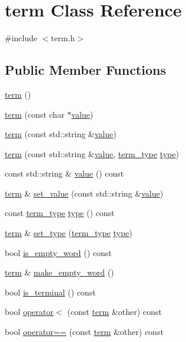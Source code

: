 \hypertarget{classterm}{}\section{term Class Reference}
\label{classterm}


{\ttfamily \#include $<$term.\+h$>$}

\subsection*{Public Member Functions}
\begin{DoxyCompactItemize}
\item 
\mbox{\hyperlink{classterm_ab3dfee59e9fa1b8fd77fcfd2e921c6bc}{term}} ()
\item 
\mbox{\hyperlink{classterm_ab2fd7e53046a9ceaf78f5e0245995103}{term}} (const char $\ast$\mbox{\hyperlink{classterm_a1c1e74f49a5ed295dba144950fe779f0}{value}})
\item 
\mbox{\hyperlink{classterm_afd455584c9f2c549142cadb7fec14ed6}{term}} (const std\+::string \&\mbox{\hyperlink{classterm_a1c1e74f49a5ed295dba144950fe779f0}{value}})
\item 
\mbox{\hyperlink{classterm_ad6dc20058aa4b1b5b9b9ce509de920c0}{term}} (const std\+::string \&\mbox{\hyperlink{classterm_a1c1e74f49a5ed295dba144950fe779f0}{value}}, \mbox{\hyperlink{term_8h_a01c5d13b4b82a95ffc3de77e52c7603b}{term\+\_\+type}} \mbox{\hyperlink{classterm_a572296f687be8c60d2c31e5c323abbb6}{type}})
\item 
const std\+::string \& \mbox{\hyperlink{classterm_a05d69d1ab04e91c8a6e4239e522a86d9}{value}} () const
\item 
\mbox{\hyperlink{classterm}{term}} \& \mbox{\hyperlink{classterm_acca1461208dd0dbb4a99f863e00fbcf0}{set\+\_\+value}} (const std\+::string \&\mbox{\hyperlink{classterm_a1c1e74f49a5ed295dba144950fe779f0}{value}})
\item 
const \mbox{\hyperlink{term_8h_a01c5d13b4b82a95ffc3de77e52c7603b}{term\+\_\+type}} \mbox{\hyperlink{classterm_acf03b98d53a1857e7bb58a229bc09f53}{type}} () const
\item 
\mbox{\hyperlink{classterm}{term}} \& \mbox{\hyperlink{classterm_acde3aa6aa227326fa8bef87952023d4c}{set\+\_\+type}} (\mbox{\hyperlink{term_8h_a01c5d13b4b82a95ffc3de77e52c7603b}{term\+\_\+type}} \mbox{\hyperlink{classterm_a572296f687be8c60d2c31e5c323abbb6}{type}})
\item 
bool \mbox{\hyperlink{classterm_a2eb38e13f1e6b8b3f8a23c94a5413875}{is\+\_\+empty\+\_\+word}} () const
\item 
\mbox{\hyperlink{classterm}{term}} \& \mbox{\hyperlink{classterm_a1d2889134295448ef5ec37f3b72e6b8e}{make\+\_\+empty\+\_\+word}} ()
\item 
bool \mbox{\hyperlink{classterm_a141ac4604eaf71b6affdabfa15f0ec03}{is\+\_\+terminal}} () const
\item 
bool \mbox{\hyperlink{classterm_a1ad8c5bd2ccda41a256096a6002ac882}{operator$<$}} (const \mbox{\hyperlink{classterm}{term}} \&other) const
\item 
bool \mbox{\hyperlink{classterm_a0bcef0b018791098b24cb1f3d7df2d68}{operator==}} (const \mbox{\hyperlink{classterm}{term}} \&other) const
\end{DoxyCompactItemize}
